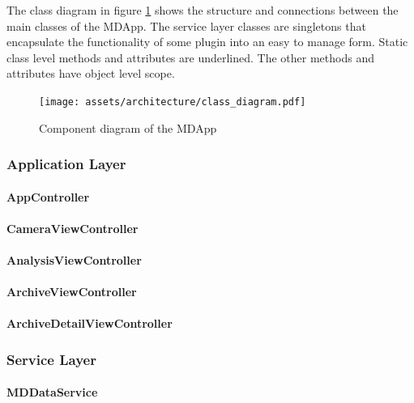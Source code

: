The class diagram in figure \ref{fig:class_dia} shows the structure and connections between the main classes of the MDApp. The service layer classes are singletons that encapsulate the functionality of some plugin into an easy to manage form. Static class level methods and attributes are underlined. The other methods and attributes have object level scope.

\begin{figure}[H]
    \centering
    \texttt{[image: assets/architecture/class\_diagram.pdf]}
    \caption{Component diagram of the MDApp}
    \label{fig:class_dia}
\end{figure}

    \subsubsection{Application Layer}
        \paragraph{AppController}
            
        \paragraph{CameraViewController}
            
        \paragraph{AnalysisViewController}
            
        \paragraph{ArchiveViewController}
            
        \paragraph{ArchiveDetailViewController}
            

    \subsubsection{Service Layer}
        \paragraph{MDDataService}
            
